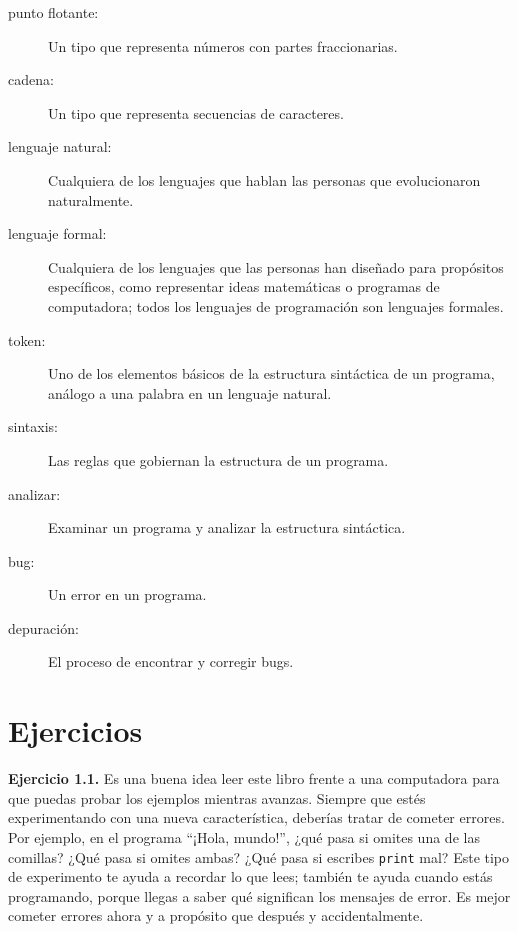 \begin{description}
\item[punto flotante:] Un tipo que representa números con partes fraccionarias.

\item[cadena:] Un tipo que representa secuencias de caracteres.

\item[lenguaje natural:] Cualquiera de los lenguajes que hablan las personas que evolucionaron naturalmente.

\item[lenguaje formal:] Cualquiera de los lenguajes que las personas han diseñado para propósitos específicos, como representar ideas matemáticas o programas de computadora; todos los lenguajes de programación son lenguajes formales.

\item[token:] Uno de los elementos básicos de la estructura sintáctica de un programa, análogo a una palabra en un lenguaje natural.

\item[sintaxis:] Las reglas que gobiernan la estructura de un programa.

\item[analizar:] Examinar un programa y analizar la estructura sintáctica.

\item[bug:] Un error en un programa.

\item[depuración:] El proceso de encontrar y corregir bugs.
\end{description}

\section{Ejercicios}

\textbf{Ejercicio 1.1.} Es una buena idea leer este libro frente a una computadora para que puedas probar los ejemplos mientras avanzas. Siempre que estés experimentando con una nueva característica, deberías tratar de cometer errores. Por ejemplo, en el programa ``¡Hola, mundo!'', ¿qué pasa si omites una de las comillas? ¿Qué pasa si omites ambas? ¿Qué pasa si escribes \texttt{print} mal? Este tipo de experimento te ayuda a recordar lo que lees; también te ayuda cuando estás programando, porque llegas a saber qué significan los mensajes de error. Es mejor cometer errores ahora y a propósito que después y accidentalmente.

